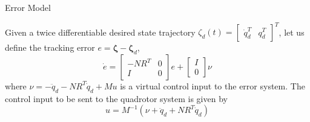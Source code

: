 \begin{frame}{Error Model}
\begin{block}{}
	Given a twice differentiable desired state trajectory $\zeta_d(t) = \begin{bmatrix}\dot{q}_d^T & q_d^T \end{bmatrix}^T$, let us define the tracking error $e = \mathbf{\zeta} - \mathbf{\zeta}_{d}$,
	\begin{equation} \label{eq:SS_error}
\dot{e} = \begin{bmatrix} 
-NR^T & 0 \\
I & 0
\end{bmatrix}e + \begin{bmatrix}
I\\
0
\end{bmatrix}\nu
\end{equation}
where $\nu = - \ddot{q}_d -NR^T\dot{q}_d + Mu$ is a virtual control input to the error system. The control input to be sent to the quadrotor system is given by
\begin{equation} \label{eq:real_control}
u = M^{-1} (\nu + \ddot{q}_d + NR^T\dot{q}_d)
\end{equation} 
\end{block}
\end{frame}

